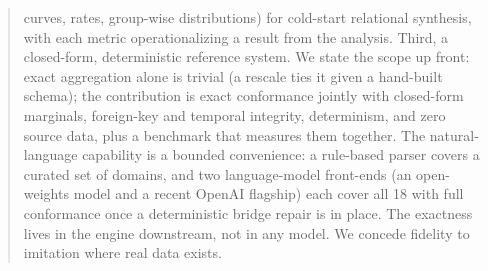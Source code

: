\documentclass[11pt]{article}
\begin{document}
\begin{abstract}
curves, rates, group-wise distributions) for cold-start relational synthesis, with each metric
operationalizing a result from the analysis. Third, a closed-form, deterministic reference system. We state the scope up
front: exact aggregation alone is trivial (a rescale ties it given a hand-built schema); the
contribution is exact conformance jointly with closed-form marginals, foreign-key and temporal
integrity, determinism, and zero source data, plus a benchmark that measures them together. The
natural-language capability is a bounded convenience: a rule-based parser covers a curated set
of domains, and two language-model front-ends (an open-weights model and a recent OpenAI
flagship) each cover all 18 with full conformance once a deterministic bridge repair is in
place. The exactness lives in the engine downstream, not in any model. We concede fidelity to
imitation where real data exists.
\end{abstract}



\end{document}
